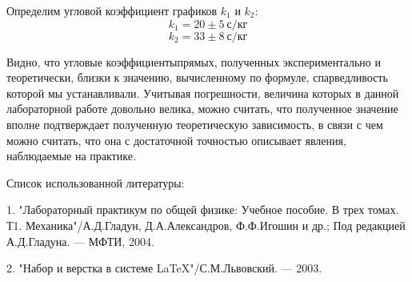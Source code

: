 \documentclass[14pt]{article}
\begin{document}
Определим угловой коэффициент графиков $k_1$ и $k_2$:
$$
	k_1 = 20 \pm 5~\text{с/кг}
$$
$$
	k_2 = 33 \pm 8~\text{с/кг}
$$

\vspace{1cm}
Видно, что угловые коэффициентыпрямых, полученных экспериментально и теоретически, близки к значению, вычисленному по формуле, спарведливость которой мы устанавливали. Учитывая погрешности, величина которых в данной лабораторной работе довольно велика, можно считать, что полученное значение вполне подтверждает полученную теоретическую зависимость, в связи с чем можно считать, что она с достаточной точностью описывает явления, наблюдаемые на практике.

\newpage
Список использованной литературы:
	
\vspace{0.5cm}
1. "Лабораторный практикум по общей физике: Учебное пособие. В трех томах. Т1. Механика"/А.Д.Гладун, Д.А.Александров,
Ф.Ф.Игошин и др.; Под редакцией А.Д.Гладуна. --- МФТИ, 2004.

2. "Набор и верстка в системе \LaTeX "/С.М.Львовский. --- 2003.
\end{document}
